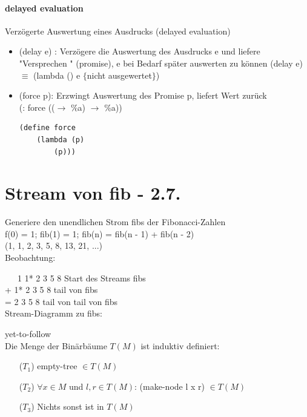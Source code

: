 \documentclass[a4paper, 20pt, openany]{book}
\begin{document}
\subsubsection{delayed evaluation}
Verzögerte Auswertung eines Ausdrucks (delayed evaluation)\\
\begin{itemize}
\item (delay e) : Verzögere die Auswertung des Ausdrucks e und liefere "Versprechen " (promise), e bei Bedarf später auswerten zu können
(delay e) $\equiv$ (lambda () e $\lbrace$nicht ausgewertet$\rbrace$)

\item (force p): Erzwingt Auswertung des Promise p, liefert Wert zurück\\
(: force (($\rightarrow$ \%a) $\rightarrow$ \%a))

\begin{lstlisting}
(define force
	(lambda (p)
		(p)))
\end{lstlisting}

\end{itemize}

\chapter{Stream von fib - 2.7.}
Generiere den unendlichen Strom fibs der Fibonacci-Zahlen\\
f(0) = 1; fib(1) = 1; fib(n) = fib(n - 1) + fib(n - 2)\\
(1, 1, 2, 3, 5, 8, 13, 21, ...)\\

Beobachtung:

\ \ \ 1 1* 2 3 5 8  Start des Streams fibs\\
+ 1* 2 3 5 8 tail von fibs\\
= 2 3 5 8 tail von tail von fibs\\

Stream-Diagramm zu fibs:

yet-to-follow\\

Die Menge der Binärbäume $T(M)$ ist induktiv definiert:
\begin{enumerate}
\item[($T_1$)] empty-tree $\in T(M)$
\item[($T_2$)] $\forall x \in M$ und $l, r \in T(M)$: (make-node l x r) $\in T(M)$
\item[($T_3$)] Nichts sonst ist in $T(M)$
\end{enumerate}
\end{document}

